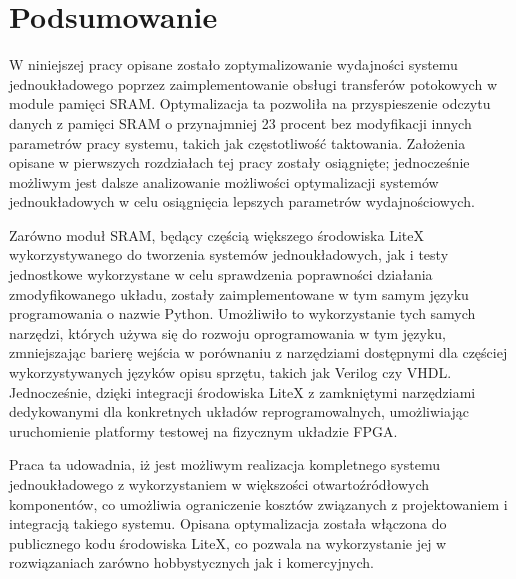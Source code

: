 \section{Podsumowanie}

W niniejszej pracy opisane zostało zoptymalizowanie wydajności systemu jednoukładowego poprzez zaimplementowanie obsługi transferów potokowych w module pamięci SRAM. Optymalizacja ta pozwoliła na przyspieszenie odczytu danych z pamięci SRAM o przynajmniej 23 procent bez modyfikacji innych parametrów pracy systemu, takich jak częstotliwość taktowania. Założenia opisane w pierwszych rozdziałach tej pracy zostały osiągnięte; jednocześnie możliwym jest dalsze analizowanie możliwości optymalizacji systemów jednoukładowych w celu osiągnięcia lepszych parametrów wydajnościowych.

Zarówno moduł SRAM, będący częścią większego środowiska LiteX wykorzystywanego do tworzenia systemów jednoukładowych, jak i testy jednostkowe wykorzystane w celu sprawdzenia poprawności działania zmodyfikowanego układu, zostały zaimplementowane w tym samym języku programowania o nazwie Python. Umożliwiło to wykorzystanie tych samych narzędzi, których używa się do rozwoju oprogramowania w tym języku, zmniejszając barierę wejścia w porównaniu z narzędziami dostępnymi dla częściej wykorzystywanych języków opisu sprzętu, takich jak Verilog czy VHDL. Jednocześnie, dzięki integracji środowiska LiteX z zamkniętymi narzędziami dedykowanymi dla konkretnych układów reprogramowalnych, umożliwiając uruchomienie platformy testowej na fizycznym układzie FPGA.

Praca ta udowadnia, iż jest możliwym realizacja kompletnego systemu jednoukładowego z wykorzystaniem w większości otwartoźródłowych komponentów, co umożliwia ograniczenie kosztów związanych z projektowaniem i integracją takiego systemu. Opisana optymalizacja została włączona do publicznego kodu środowiska LiteX, co pozwala na wykorzystanie jej w rozwiązaniach zarówno hobbystycznych jak i komercyjnych.
